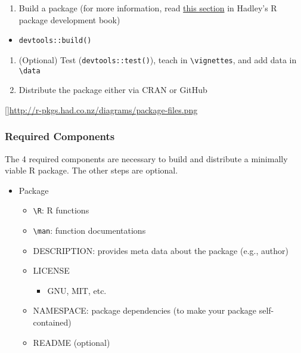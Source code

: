 \documentclass[
]{book}
\providecommand{\tightlist}{%
  \setlength{\itemsep}{0pt}\setlength{\parskip}{0pt}}
\begin{document}
\begin{enumerate}
\def\labelenumi{\arabic{enumi}.}
\setcounter{enumi}{3}
\tightlist
\item
  Build a package (for more information, read \href{http://r-pkgs.had.co.nz/package.html}{this section} in Hadley's R package development book)
\end{enumerate}

\begin{itemize}
\tightlist
\item
  \texttt{devtools::build()}
\end{itemize}

\begin{enumerate}
\def\labelenumi{\arabic{enumi}.}
\setcounter{enumi}{4}
\tightlist
\item
  (Optional) Test (\texttt{devtools::test()}), teach in \texttt{\textbackslash{}vignettes}, and add data in \texttt{\textbackslash{}data}
\item
  Distribute the package either via CRAN or GitHub
\end{enumerate}

{[}{]}\url{http://r-pkgs.had.co.nz/diagrams/package-files.png}

\hypertarget{required-components}{%
\subsubsection{Required Components}\label{required-components}}

The 4 required components are necessary to build and distribute a minimally viable R package. The other steps are optional.

\begin{itemize}
\tightlist
\item
  Package

  \begin{itemize}
  \tightlist
  \item
    \texttt{\textbackslash{}R}: R functions
  \item
    \texttt{\textbackslash{}man}: function documentations
  \item
    DESCRIPTION: provides meta data about the package (e.g., author)
  \item
    LICENSE

    \begin{itemize}
    \tightlist
    \item
      GNU, MIT, etc.
    \end{itemize}
  \item
    NAMESPACE: package dependencies (to make your package self-contained)
  \item
    README (optional)
  \end{itemize}
\end{itemize}
\end{document}
